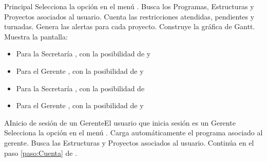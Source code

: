   \begin{UCtrayectoria}{Principal}
    \UCpaso[\UCactor] Selecciona la opción  en el menú  . \label{paso:selecciona}
    \UCpaso Busca los Programas, Estructuras y Proyectos asociados al usuario.
    \UCpaso Cuenta las restricciones atendidas, pendientes y turnadas. \label{paso:Cuenta}
    \UCpaso Genera las alertas para cada proyecto.
    \UCpaso Construye la gráfica de Gantt.
    \UCpaso Muestra la pantalla: \label{paso:muestra}
    \begin{itemize}

     \item Para la Secretaría , con la posibilidad de  y   
     \item Para el Gerente , con la posibilidad de  y   

     \item Para la Secretaría , con la posibilidad de   
     \item Para el Gerente , con la posibilidad de  y   

    \end{itemize}
  \end{UCtrayectoria}
  
  \begin{UCtrayectoriaA}{A}{Inicio de sesión de un Gerente}{El usuario que inicia sesión es un Gerente}
    \UCpaso [\UCactor] Selecciona la opción  en el menú .
    \UCpaso Carga automáticamente el programa asociado al gerente.
    \UCpaso Busca las Estructuras y Proyectos asociados al usuario.
    \UCpaso Continúa en el paso \ref{paso:Cuenta} de .
  \end{UCtrayectoriaA}

